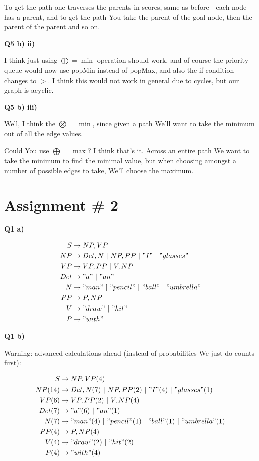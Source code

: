 \documentclass{article}
\newcommand*\OR{\ |\ }
\begin{document}
	To get the path one traverses the parents in scores, same as before - each node has a parent, and to get the path You take the parent of the goal node, then the parent of the parent and so on.
	
\textbf{Q5 b) ii)}
	
	I think just using $\bigoplus = \min$ operation should work, and of course the priority queue would now use popMin instead of popMax, and also the if condition changes to $>$. I think this would not work in general due to cycles, but our graph is acyclic. 
	
\textbf{Q5 b) iii)}

	Well, I think the $\bigotimes = \min$, since given a path We'll want to take the minimum out of all the edge values.
	
	Could You use $\bigoplus = \max$? I think that's it. Across an entire path We want to take the minimum to find the minimal value, but when choosing amongst a number of possible edges to take, We'll choose the maximum. 
	
\newpage
\section{Assignment \# 2}

\textbf{Q1 a)}

	\begin{align}
		S &\to NP, VP\\
		NP &\to Det, N \OR NP, PP \OR "I" \OR "glasses"\\
		VP &\to VP, PP \OR V, NP\\		
		Det &\to "a" \OR "an"\\
		N &\to "man" \OR "pencil" \OR "ball" \OR "umbrella"\\
		PP &\to P, NP\\
		V &\to "draw" \OR "hit"\\
		P &\to "with" 
	\end{align}
	
\textbf{Q1 b)}

	Warning: advanced calculations ahead (instead of probabilities We just do counts first):

	\begin{align}
		S &\to NP, VP (4)\\
		NP (14) &\to Det, N (7) \OR NP, PP (2)\OR "I" (4)\OR "glasses" (1)\\
		VP (6)&\to VP, PP (2)\OR V, NP (4)\\		
		Det (7)&\to "a" (6) \OR "an"(1)\\
		N (7)&\to "man" (4)\OR "pencil"(1) \OR "ball"(1) \OR "umbrella"(1)\\
		PP (4)&\to P, NP (4)\\
		V (4)&\to "draw" (2) \OR "hit"(2)\\
		P (4)&\to "with" (4) 
	\end{align}
	
\end{document}

